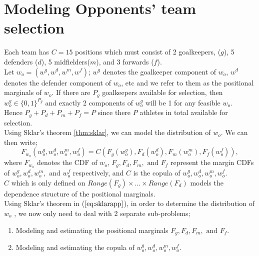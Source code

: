\documentclass[12pt,oneside,a4paper]{book}
\theoremstyle{definition}
\theoremstyle{remark}
\begin{document}

		\section{Modeling Opponents' team selection}
			Each team has $C=15$ positions which must consist of 2 goalkeepers, ($g$), 5 defenders ($d$), 5 midfielders($m$), and 3 forwards ($f$).\\

			Let $w_o = (w^g,w^d,w^m,w^f)$; $w^g$ denotes the goalkeeper component of $w_o$, $w^d$ denotes the defender component of $w_o$, etc and we refer to them as the positional marginals of $w_o$. If there are $P_g$ goalkeepers available for selection, then $w_o^g \in \{0,1\}^{P_g}$ and exactly 2 components of $w_o^g$ will be 1 for any feasible $w_o$.\\
			Hence $P_g+P_d+P_m+P_f=P$ since there $P$ athletes in total available for selection.\\
			Using Sklar's theorem \ref{thm:sklar}, we can model the distribution of $w_o$. We can then write;
			\begin{equation}\label{Eq:sklarapp}
				F_{w_o}(w^g_o,w^d_o,w^m_o,w^f_o) = C(F_g(w^g_o),F_d(w^d_o),F_m(w^m_o),F_f(w^f_o)),
			\end{equation}
			where $F_{w_o}$ denotes the CDF of $w_o$, $F_g, F_d, F_m, \text{ and }F_f$ represent the margin CDFs of $w_o^g, w_o^d, w_o^m, \text{ and } w_o^f$ respectively, and $C$ is the copula of $w_o^g,w_o^d,w_o^m,w_o^f$.\\
			$C$ which is only defined on $Range(F_g)\times \dots \times Range(F_d)$ models the dependence structure of the positional marginals.\\
			Using Sklar's theorem in ($\ref{eq:sklarapp}$), in order to determine the distribution of $w_o$ , we now only need to deal with 2 separate sub-problems;
				\begin{enumerate}
					\item[(i).] Modeling and estimating the positional marginals $F_g, F_d, F_m, \text{ and }F_f.$
					\item[(ii).] Modeling and estimating the copula of $w_o^g,w_o^d,w_o^m,w_o^f$.
				\end{enumerate}
\end{document}
